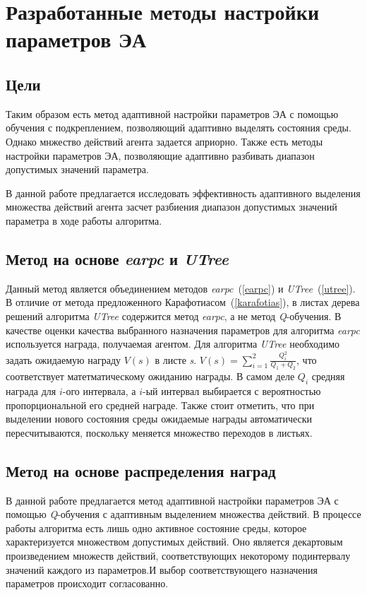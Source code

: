 \chapter{Разработанные методы настройки параметров ЭА}
\label{proposed_chapter}
\section{Цели}
Таким образом есть метод адаптивной настройки параметров ЭА с помощью обучения с подкреплением, позволяющий адаптивно выделять состояния среды. Однако мнжество действий агента задается априорно. Также есть методы настройки параметров ЭА, позволяющие адаптивно разбивать диапазон допустимых значений параметра.

В данной работе предлагается исследовать эффективность адаптивного выделения множества действий агента засчет разбиения диапазон допустимых значений параметра в ходе работы алгоритма. 

\section{Метод на основе \textit{earpc} и \textit{UTree}}
\label{composing_method}
Данный метод является объединением методов \textit{earpc}~(\ref{earpc}) и \textit{UTree}~(\ref{utree}). В отличие от метода предложенного Карафотиасом~(\ref{karafotias}), в листах дерева решений алгоритма \textit{UTree} содержится метод \textit{earpc}, а не метод \textit{Q}-обучения. В качестве оценки качества выбранного назначения параметров для алгоритма \textit{earpc} используется награда, получаемая агентом. Для алгоритма \textit{UTree} необходимо задать ожидаемую награду $V(s)$ в листе \textit{s}. $V(s) = \sum\limits_{i = 1}^2{\frac{Q_i^2}{Q_1 + Q_2}}$, что соответствует матетматическому ожиданию награды. В самом деле $Q_i$ средняя награда для $i$-ого интервала, а $i$-ый интервал выбирается с вероятностью пропорциональной его средней награде. Также стоит отметить, что при выделении нового состояния среды ожидаемые награды автоматически пересчитываются, поскольку меняется множество переходов в листьях.

\section{Метод на основе распределения наград}
\label{dist_method}

В данной работе предлагается метод адаптивной настройки параметров ЭА с помощью \textit{Q}-обучения с адаптивным выделением множества действий. В процессе работы алгоритма есть лишь одно активное состояние среды, которое характеризуется множеством допустимых действий. Оно является декартовым произведением множеств действий, соответствующих некоторому подинтервалу значений каждого из параметров.И выбор соответствующего назначения параметров происходит согласованно.

